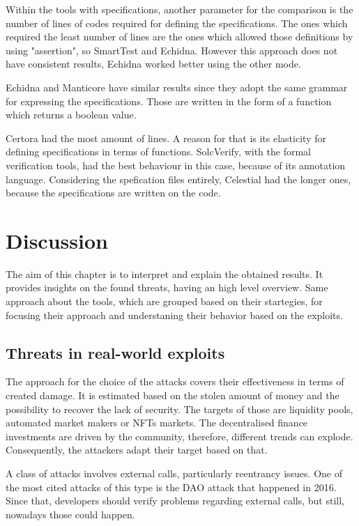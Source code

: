 Within the tools with specifications, another parameter for the comparison is the number of lines of codes required for defining the specifications. 
The ones which required the least number of lines are the ones which allowed those definitions by using "assertion", so SmartTest and Echidna. 
However this approach does not have consistent results, Echidna worked better using the other mode. 

Echidna and Manticore have similar results since they adopt the same grammar for expressing the specifications. 
Those are written in the form of a function which returns a boolean value.

Certora had the most amount of lines. A reason for that is its elasticity for defining specifications in terms of functions. 
SolcVerify, with the formal verification tools, had the best behaviour in this case, because of its annotation language. 
Considering the spefication files entirely, Celestial had the longer ones, because the specifications are written on the code.

\chapter{Discussion}
\label{ch:Discussion}

The aim of this chapter is to interpret and explain the obtained results. 
It provides insights on the found threats, having an high level overview. 
Same approach about the tools, which are grouped based on their startegies, for focusing their approach and understaning their behavior based on the exploits.

\section{Threats in real-world exploits}

The approach for the choice of the attacks covers their effectiveness in terms of created damage. 
It is estimated based on the stolen amount of money and the possibility to recover the lack of security. 
The targets of those are liquidity pools, automated market makers or NFTs markets. 
The decentralised finance investments are driven by the community, therefore, different trends can explode. 
Consequently, the attackers adapt their target based on that.

A class of attacks involves external calls, particularly reentrancy issues. 
One of the most cited attacks of this type is the DAO attack that happened in 2016. 
Since that, developers should verify problems regarding external calls, but still, nowadays those could happen. 

